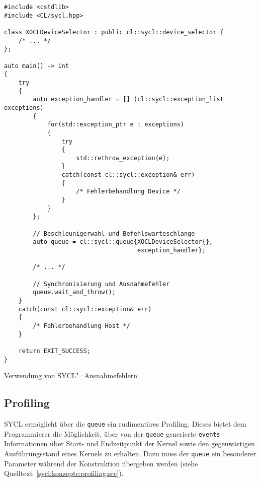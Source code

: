 \begin{code}
    \begin{verbatim}
#include <cstdlib>
#include <CL/sycl.hpp>

class XOCLDeviceSelector : public cl::sycl::device_selector {
    /* ... */
};

auto main() -> int
{
    try
    {
        auto exception_handler = [] (cl::sycl::exception_list exceptions)
        {
            for(std::exception_ptr e : exceptions)
            {
                try
                {
                    std::rethrow_exception(e);
                }
                catch(const cl::sycl::exception& err)
                {
                    /* Fehlerbehandlung Device */
                }
            }
        };

        // Beschleunigerwahl und Befehlswarteschlange
        auto queue = cl::sycl::queue{XOCLDeviceSelector{},
                                     exception_handler};

        /* ... */

        // Synchronisierung und Ausnahmefehler
        queue.wait_and_throw();
    }
    catch(const cl::sycl::exception& err)
    {
        /* Fehlerbehandlung Host */
    }

    return EXIT_SUCCESS;
}
    \end{verbatim}
    \caption{Verwendung von SYCL"=Ausnahmefehlern}
    \label{sycl:konzepte:exceptions:src}
\end{code}

\subsection{Profiling}

SYCL ermöglicht über die \texttt{queue} ein rudimentäres Profiling. Dieses
bietet dem Programmierer die Möglichkeit, über von der \texttt{queue} generierte
\texttt{events} Informationen über Start- und Endzeitpunkt der Kernel sowie den
gegenwärtigen Ausführungsstand eines Kernels zu erhalten. Dazu muss der
\texttt{queue} ein besonderer Parameter während der Konstruktion übergeben
werden (siehe Quelltext~\ref{sycl:konzepte:profiling:src}).

